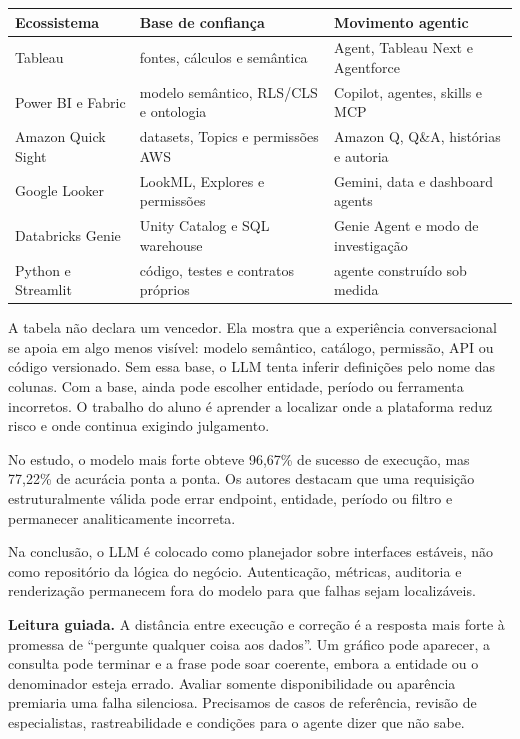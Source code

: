 \noindent\begin{tabularx}{\textwidth}{@{}>{\raggedright\arraybackslash}p{2.7cm}YY@{}}
\toprule
\textbf{Ecossistema} & \textbf{Base de confiança} & \textbf{Movimento agentic} \\
\midrule
Tableau & fontes, cálculos e semântica & Agent, Tableau Next e Agentforce \\
Power BI e Fabric & modelo semântico, RLS/CLS e ontologia & Copilot, agentes, skills e MCP \\
Amazon Quick Sight & datasets, Topics e permissões AWS & Amazon Q, Q\&A, histórias e autoria \\
Google Looker & LookML, Explores e permissões & Gemini, data e dashboard agents \\
Databricks Genie & Unity Catalog e SQL warehouse & Genie Agent e modo de investigação \\
Python e Streamlit & código, testes e contratos próprios & agente construído sob medida \\
\bottomrule
\end{tabularx}

A tabela não declara um vencedor. Ela mostra que a experiência conversacional se apoia em algo menos visível: modelo semântico, catálogo, permissão, API ou código versionado. Sem essa base, o LLM tenta inferir definições pelo nome das colunas. Com a base, ainda pode escolher entidade, período ou ferramenta incorretos. O trabalho do aluno é aprender a localizar onde a plataforma reduz risco e onde continua exigindo julgamento.

\begin{ArticleBox}
No estudo, o modelo mais forte obteve 96,67\% de sucesso de execução, mas 77,22\% de acurácia ponta a ponta. Os autores destacam que uma requisição estruturalmente válida pode errar endpoint, entidade, período ou filtro e permanecer analiticamente incorreta.

Na conclusão, o LLM é colocado como planejador sobre interfaces estáveis, não como repositório da lógica do negócio. Autenticação, métricas, auditoria e renderização permanecem fora do modelo para que falhas sejam localizáveis.
\end{ArticleBox}

\noindent\textbf{Leitura guiada.} A distância entre execução e correção é a resposta mais forte à promessa de ``pergunte qualquer coisa aos dados''. Um gráfico pode aparecer, a consulta pode terminar e a frase pode soar coerente, embora a entidade ou o denominador esteja errado. Avaliar somente disponibilidade ou aparência premiaria uma falha silenciosa. Precisamos de casos de referência, revisão de especialistas, rastreabilidade e condições para o agente dizer que não sabe.

